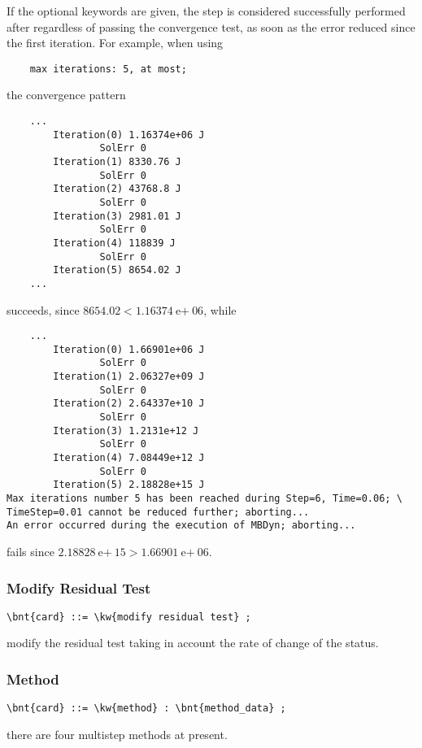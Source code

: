 If the optional keywords  are given,
the step is considered successfully performed after 
regardless of passing the convergence test, as soon as the error
reduced since the first iteration.
For example, when using
\begin{verbatim}
    max iterations: 5, at most;
\end{verbatim}
the convergence pattern
\begin{verbatim}
    ...
        Iteration(0) 1.16374e+06 J
                SolErr 0
        Iteration(1) 8330.76 J
                SolErr 0
        Iteration(2) 43768.8 J
                SolErr 0
        Iteration(3) 2981.01 J
                SolErr 0
        Iteration(4) 118839 J
                SolErr 0
        Iteration(5) 8654.02 J
    ...
\end{verbatim}
succeeds, since $8654.02 < 1.16374\text{e$+$}06$, while
\begin{verbatim}
    ...
        Iteration(0) 1.66901e+06 J
                SolErr 0
        Iteration(1) 2.06327e+09 J
                SolErr 0
        Iteration(2) 2.64337e+10 J
                SolErr 0
        Iteration(3) 1.2131e+12 J
                SolErr 0
        Iteration(4) 7.08449e+12 J
                SolErr 0
        Iteration(5) 2.18828e+15 J
Max iterations number 5 has been reached during Step=6, Time=0.06; \
TimeStep=0.01 cannot be reduced further; aborting...
An error occurred during the execution of MBDyn; aborting... 
\end{verbatim}
fails since $2.18828\text{e$+$}15 > 1.66901\text{e$+$}06$.


\subsubsection{Modify Residual Test}
\begin{Verbatim}[commandchars=\\\{\}]
    \bnt{card} ::= \kw{modify residual test} ;
\end{Verbatim}
modify the residual test taking in account the rate of change of the status.

\subsubsection{Method}
\begin{Verbatim}[commandchars=\\\{\}]
    \bnt{card} ::= \kw{method} : \bnt{method_data} ;
\end{Verbatim}
there are four multistep methods at present. 


